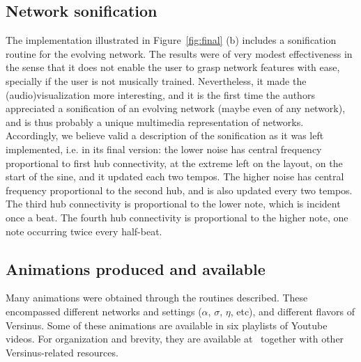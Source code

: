 \documentclass[runningheads]{llncs}
\begin{document}
\subsection{Network sonification}
The implementation illustrated in Figure~\ref{fig:final} (b) includes a sonification routine for the evolving network.
The results were of very modest effectiveness in the sense that it does not enable the user to grasp network features with ease, specially if the user is not musically trained.
Nevertheless, it made the (audio)visualization more interesting, and it is the first time the authors appreciated a sonification of an evolving network (maybe even of any network), and is thus probably a unique multimedia representation of networks.
Accordingly, we believe valid a description of the sonification as it was left implemented, i.e. in its final version: the lower noise has central frequency proportional to first hub connectivity, at the extreme left on the layout, on the start of the sine, and it updated each two tempos. The higher noise has central frequency proportional to the second hub, and is also updated every two tempos. The third hub connectivity is proportional to the lower note, which is incident once a beat. The fourth hub connectivity is proportional to the higher note, one note occurring twice every half-beat.

\subsection{Animations produced and available}\label{sec:vid}
Many animations were obtained through the routines described.
These encompassed different networks and settings ($\alpha$, $\sigma$, $\eta$,
etc), and different flavors of Versinus.
Some of these animations are available in six playlists of Youtube videos.
For organization and brevity, they are available at~\cite{verRepo} together with other Versinus-related resources.
\end{document}
